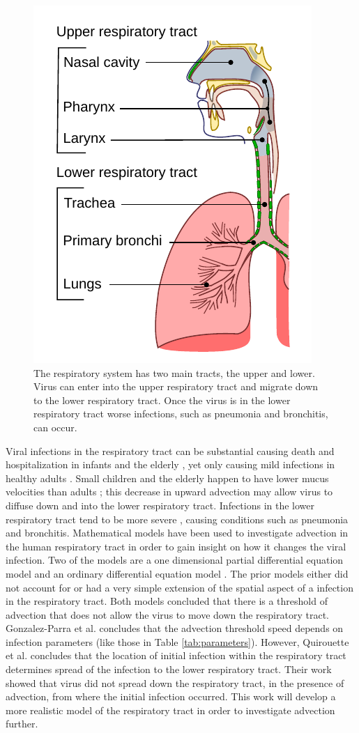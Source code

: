 \documentclass[a4paper]{article}
\begin{document}
\begin{figure}[H]
    \centering
    \includegraphics[width=0.4\linewidth]{Figures/Illu_conducting_passages.pdf}
    \caption{The respiratory system has two main tracts, the upper and lower. Virus can enter into the upper respiratory tract and migrate down to the lower respiratory tract. Once the virus is in the lower respiratory tract worse infections, such as pneumonia and bronchitis, can occur.}
    \label{fig:RespiratoryTract}
\end{figure}

\noindent
Viral infections in the respiratory tract can be substantial causing death and hospitalization in infants \cite{Geoghegan} and the elderly \cite{Fleming}, yet only causing mild infections in healthy adults \cite{Hall, Lee, Bagga, Mills}. Small children and the elderly happen to have lower mucus velocities than adults \cite{Sturm, Puchelle, Grubb, Oliveira, Ho}; this decrease in upward advection may allow virus to diffuse down and into the lower respiratory tract. Infections in the lower respiratory tract tend to be more severe \cite{Naorat, Kaneko, Shi, Atwell, HallC, Takeyama, Park}, causing conditions such as pneumonia and bronchitis. Mathematical models have been used to investigate advection in the human respiratory tract in order to gain insight on how it changes the viral infection. Two of the models are a one dimensional partial differential equation model \cite{Quirouette} and an ordinary differential equation model \cite{diffusionmodel}. The prior models either did not account for or had a very simple extension of the spatial aspect of a infection in the respiratory tract. Both models concluded that there is a threshold of advection that does not allow the virus to move down the respiratory tract. Gonzalez-Parra et al. \cite{diffusionmodel} concludes that the advection threshold speed depends on infection parameters (like those in Table \ref{tab:parameters}). However, Quirouette et al. \cite{Quirouette} concludes that the location of initial infection within the respiratory tract determines spread of the infection to the lower respiratory tract. Their work showed that virus did not spread down the respiratory tract, in the presence of advection, from where the initial infection occurred. This work will develop a more realistic model of the respiratory tract in order to investigate advection further.\\
\end{document}
